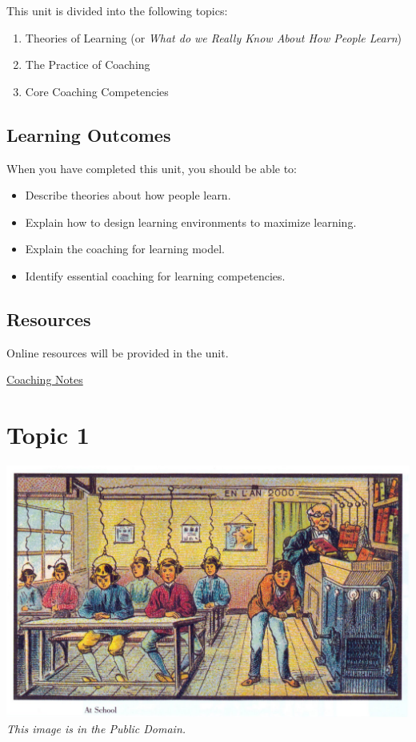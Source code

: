 \documentclass[
]{book}
\providecommand{\tightlist}{%
  \setlength{\itemsep}{0pt}\setlength{\parskip}{0pt}}
\begin{document}
This unit is divided into the following topics:

\begin{enumerate}
\def\labelenumi{\arabic{enumi}.}
\tightlist
\item
  Theories of Learning (or \emph{What do we Really Know About How People Learn})
\item
  The Practice of Coaching
\item
  Core Coaching Competencies
\end{enumerate}

\hypertarget{learning-outcomes-2}{%
\subsection*{Learning Outcomes}\label{learning-outcomes-2}}

When you have completed this unit, you should be able to:

\begin{itemize}
\tightlist
\item
  Describe theories about how people learn.
\item
  Explain how to design learning environments to maximize learning.
\item
  Explain the coaching for learning model.
\item
  Identify essential coaching for learning competencies.
\end{itemize}

\hypertarget{resources-3}{%
\subsection*{Resources}\label{resources-3}}

Online resources will be provided in the unit.

\href{https://ma-lead.github.io/ldrs663/coaching-notes.html}{Coaching Notes}

\hypertarget{topic-1-1}{%
\section*{Topic 1}\label{topic-1-1}}

\includegraphics{assets/u4/France_in_XXI_Century._School.jpg}
\emph{This image is in the Public Domain.}
\end{document}
